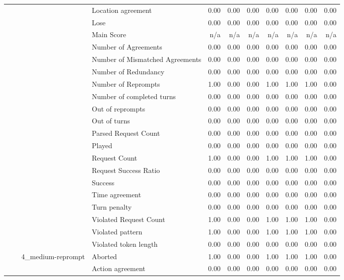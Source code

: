 \begin{tabular}{llllrrrrrrr}
 &  &  & Location agreement & 0.00 & 0.00 & 0.00 & 0.00 & 0.00 & 0.00 & 0.00 \\
 &  &  & Lose & 0.00 & 0.00 & 0.00 & 0.00 & 0.00 & 0.00 & 0.00 \\
 &  &  & Main Score & n/a & n/a & n/a & n/a & n/a & n/a & n/a \\
 &  &  & Number of Agreements & 0.00 & 0.00 & 0.00 & 0.00 & 0.00 & 0.00 & 0.00 \\
 &  &  & Number of Mismatched Agreements & 0.00 & 0.00 & 0.00 & 0.00 & 0.00 & 0.00 & 0.00 \\
 &  &  & Number of Redundancy & 0.00 & 0.00 & 0.00 & 0.00 & 0.00 & 0.00 & 0.00 \\
 &  &  & Number of Reprompts & 1.00 & 0.00 & 0.00 & 1.00 & 1.00 & 1.00 & 0.00 \\
 &  &  & Number of completed turns & 0.00 & 0.00 & 0.00 & 0.00 & 0.00 & 0.00 & 0.00 \\
 &  &  & Out of reprompts & 0.00 & 0.00 & 0.00 & 0.00 & 0.00 & 0.00 & 0.00 \\
 &  &  & Out of turns & 0.00 & 0.00 & 0.00 & 0.00 & 0.00 & 0.00 & 0.00 \\
 &  &  & Parsed Request Count & 0.00 & 0.00 & 0.00 & 0.00 & 0.00 & 0.00 & 0.00 \\
 &  &  & Played & 0.00 & 0.00 & 0.00 & 0.00 & 0.00 & 0.00 & 0.00 \\
 &  &  & Request Count & 1.00 & 0.00 & 0.00 & 1.00 & 1.00 & 1.00 & 0.00 \\
 &  &  & Request Success Ratio & 0.00 & 0.00 & 0.00 & 0.00 & 0.00 & 0.00 & 0.00 \\
 &  &  & Success & 0.00 & 0.00 & 0.00 & 0.00 & 0.00 & 0.00 & 0.00 \\
 &  &  & Time agreement & 0.00 & 0.00 & 0.00 & 0.00 & 0.00 & 0.00 & 0.00 \\
 &  &  & Turn penalty & 0.00 & 0.00 & 0.00 & 0.00 & 0.00 & 0.00 & 0.00 \\
 &  &  & Violated Request Count & 1.00 & 0.00 & 0.00 & 1.00 & 1.00 & 1.00 & 0.00 \\
 &  &  & Violated pattern & 1.00 & 0.00 & 0.00 & 1.00 & 1.00 & 1.00 & 0.00 \\
 &  &  & Violated token length & 0.00 & 0.00 & 0.00 & 0.00 & 0.00 & 0.00 & 0.00 \\
\cline{3-11}
 &  & \multirow[t]{27}{*}{4_medium-reprompt} & Aborted & 1.00 & 0.00 & 0.00 & 1.00 & 1.00 & 1.00 & 0.00 \\
 &  &  & Action agreement & 0.00 & 0.00 & 0.00 & 0.00 & 0.00 & 0.00 & 0.00 \\

\end{tabular}
